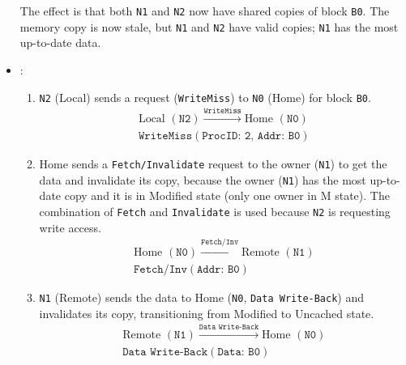 \begin{itemize}
\begin{figure}[!htp]
    \end{figure}
    The effect is that both \texttt{N1} and \texttt{N2} now have shared copies of block \texttt{B0}. The memory copy is now stale, but \texttt{N1} and \texttt{N2} have valid copies; \texttt{N1} has the most up-to-date data.


    \item {}:
    \begin{enumerate}
        \item \texttt{N2} (Local) sends a request (\texttt{WriteMiss}) to \texttt{N0} (Home) for block \texttt{B0}.
        \begin{gather*}
            \text{Local } (\texttt{N2}) \xrightarrow{\texttt{WriteMiss}} \text{Home } (\texttt{N0})
            \\[.3em]
            \texttt{WriteMiss}(\texttt{ProcID: 2, Addr: B0})
        \end{gather*}

        \item Home sends a \texttt{Fetch/Invalidate} request to the owner (\texttt{N1}) to get the data and invalidate its copy, because the owner (\texttt{N1}) has the most up-to-date copy and it is in Modified state (only one owner in M state). The combination of \texttt{Fetch} and \texttt{Invalidate} is used because \texttt{N2} is requesting write access.
        \begin{gather*}
            \text{Home } (\texttt{N0}) \xrightarrow{\texttt{Fetch/Inv}} \text{Remote } (\texttt{N1})
            \\[.3em]
            \texttt{Fetch/Inv}(\texttt{Addr: B0})
        \end{gather*}

        \item \texttt{N1} (Remote) sends the data to Home (\texttt{N0}, \texttt{Data Write-Back}) and invalidates its copy, transitioning from Modified to Uncached state.
        \begin{gather*}
            \text{Remote } (\texttt{N1}) \xrightarrow{\texttt{Data Write-Back}} \text{Home } (\texttt{N0})
            \\[.3em]
            \texttt{Data Write-Back}(\texttt{Data: B0})
        \end{gather*}


\end{enumerate}
\end{itemize}
